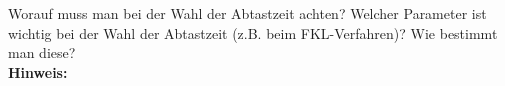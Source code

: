 \begin{question}[section=6,name={Abtastzeit},difficulty=,type=mdl,tags={}]
	Worauf muss man bei der Wahl der Abtastzeit achten? Welcher Parameter ist wichtig bei der Wahl der Abtastzeit (z.B. beim FKL-Verfahren)? Wie bestimmt man diese?
	\\ \textbf{Hinweis:}\\
	
\end{question}
\begin{solution}
	
\end{solution}